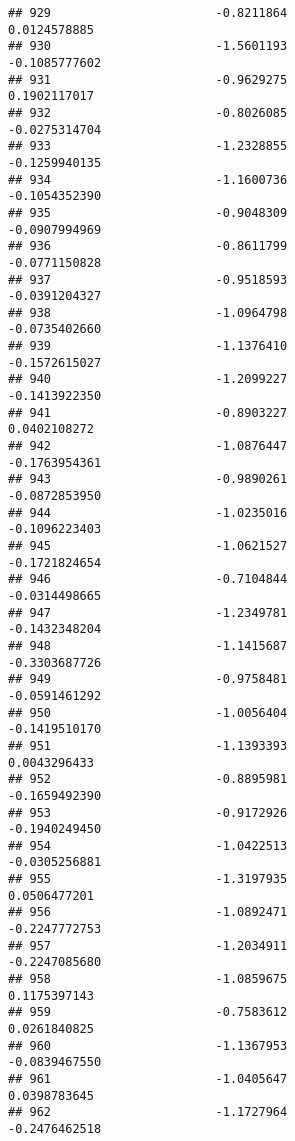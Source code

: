 \documentclass[
]{article}
\begin{document}
\begin{verbatim}
## 929                       -0.8211864                          0.0124578885
## 930                       -1.5601193                         -0.1085777602
## 931                       -0.9629275                          0.1902117017
## 932                       -0.8026085                         -0.0275314704
## 933                       -1.2328855                         -0.1259940135
## 934                       -1.1600736                         -0.1054352390
## 935                       -0.9048309                         -0.0907994969
## 936                       -0.8611799                         -0.0771150828
## 937                       -0.9518593                         -0.0391204327
## 938                       -1.0964798                         -0.0735402660
## 939                       -1.1376410                         -0.1572615027
## 940                       -1.2099227                         -0.1413922350
## 941                       -0.8903227                          0.0402108272
## 942                       -1.0876447                         -0.1763954361
## 943                       -0.9890261                         -0.0872853950
## 944                       -1.0235016                         -0.1096223403
## 945                       -1.0621527                         -0.1721824654
## 946                       -0.7104844                         -0.0314498665
## 947                       -1.2349781                         -0.1432348204
## 948                       -1.1415687                         -0.3303687726
## 949                       -0.9758481                         -0.0591461292
## 950                       -1.0056404                         -0.1419510170
## 951                       -1.1393393                          0.0043296433
## 952                       -0.8895981                         -0.1659492390
## 953                       -0.9172926                         -0.1940249450
## 954                       -1.0422513                         -0.0305256881
## 955                       -1.3197935                          0.0506477201
## 956                       -1.0892471                         -0.2247772753
## 957                       -1.2034911                         -0.2247085680
## 958                       -1.0859675                          0.1175397143
## 959                       -0.7583612                          0.0261840825
## 960                       -1.1367953                         -0.0839467550
## 961                       -1.0405647                          0.0398783645
## 962                       -1.1727964                         -0.2476462518

\end{verbatim}
\end{document}
